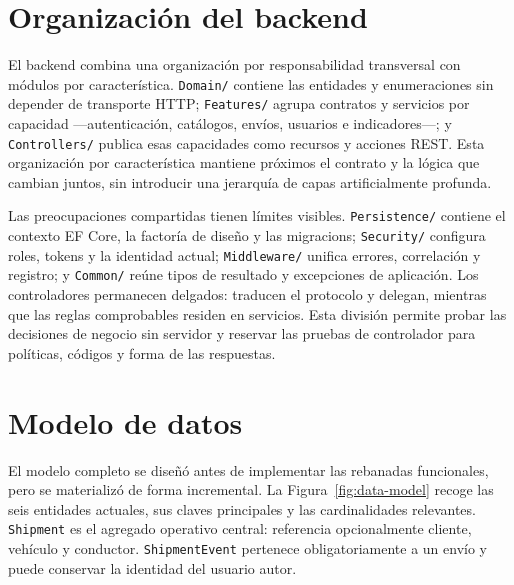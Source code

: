 \section{Organización del backend}

El backend combina una organización por responsabilidad transversal con módulos por característica. \texttt{Domain/} contiene las entidades y enumeraciones sin depender de transporte HTTP; \texttt{Features/} agrupa contratos y servicios por capacidad ---autenticación, catálogos, envíos, usuarios e indicadores---; y \texttt{Controllers/} publica esas capacidades como recursos y acciones REST. Esta organización por característica mantiene próximos el contrato y la lógica que cambian juntos, sin introducir una jerarquía de capas artificialmente profunda.

Las preocupaciones compartidas tienen límites visibles. \texttt{Persistence/} contiene el contexto EF Core, la factoría de diseño y las \glspl{migracion}; \texttt{Security/} configura roles, tokens y la identidad actual; \texttt{Middleware/} unifica errores, correlación y registro; y \texttt{Common/} reúne tipos de resultado y excepciones de aplicación. Los controladores permanecen delgados: traducen el protocolo y delegan, mientras que las reglas comprobables residen en servicios. Esta división permite probar las decisiones de negocio sin servidor y reservar las pruebas de controlador para políticas, códigos y forma de las respuestas.

\section{Modelo de datos}

El modelo completo se diseñó antes de implementar las rebanadas funcionales, pero se materializó de forma incremental. La Figura~\ref{fig:data-model} recoge las seis entidades actuales, sus claves principales y las cardinalidades relevantes. \texttt{Shipment} es el \gls{agregado} operativo central: referencia opcionalmente cliente, vehículo y conductor. \texttt{ShipmentEvent} pertenece obligatoriamente a un envío y puede conservar la identidad del usuario autor.

